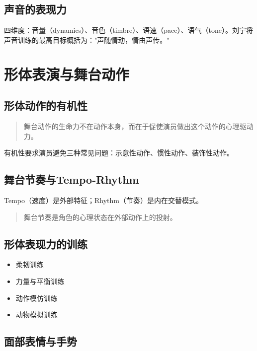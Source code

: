 \subsection{声音的表现力}

四维度：音量（dynamics）、音色（timbre）、语速（pace）、语气（tone）。刘宁将声音训练的最高目标概括为："声随情动，情由声传。"\cite{liu:speech}

\section{形体表演与舞台动作}

\subsection{形体动作的有机性}

\begin{quote}
舞台动作的生命力不在动作本身，而在于促使演员做出这个动作的心理驱动力。\cite{ye:acting}
\end{quote}

有机性要求演员避免三种常见问题：示意性动作、惯性动作、装饰性动作。

\subsection{舞台节奏与Tempo-Rhythm}

Tempo（速度）是外部特征；Rhythm（节奏）是内在交替模式。

\begin{quote}
舞台节奏是角色的心理状态在外部动作上的投射。\cite{ye:acting}
\end{quote}

\subsection{形体表现力的训练}

\begin{itemize}
    \item 柔韧训练
    \item 力量与平衡训练
    \item 动作模仿训练
    \item 动物模拟训练
\end{itemize}

\subsection{面部表情与手势}


